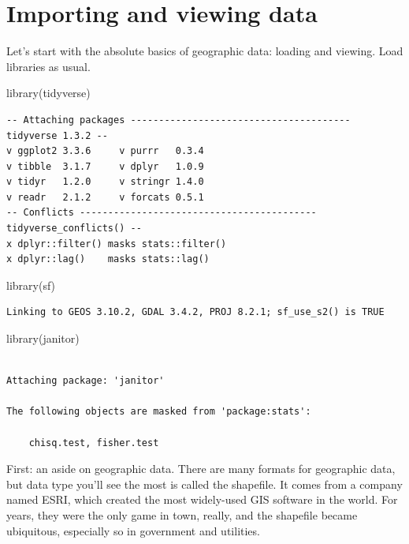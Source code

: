 \documentclass[
  letterpaper,
  DIV=11,
  numbers=noendperiod]{scrreprt}
\newenvironment{Shaded}{\begin{snugshade}}{\end{snugshade}}
\newcommand{\FunctionTok}[1]{\textcolor[rgb]{0.28,0.35,0.67}{#1}}
\newcommand{\NormalTok}[1]{\textcolor[rgb]{0.00,0.23,0.31}{#1}}
\begin{document}
\hypertarget{importing-and-viewing-data}{%
\section{Importing and viewing data}\label{importing-and-viewing-data}}

Let's start with the absolute basics of geographic data: loading and
viewing. Load libraries as usual.

\begin{Shaded}
\begin{Highlighting}[]
\FunctionTok{library}\NormalTok{(tidyverse)}
\end{Highlighting}
\end{Shaded}

\begin{verbatim}
-- Attaching packages --------------------------------------- tidyverse 1.3.2 --
v ggplot2 3.3.6     v purrr   0.3.4
v tibble  3.1.7     v dplyr   1.0.9
v tidyr   1.2.0     v stringr 1.4.0
v readr   2.1.2     v forcats 0.5.1
-- Conflicts ------------------------------------------ tidyverse_conflicts() --
x dplyr::filter() masks stats::filter()
x dplyr::lag()    masks stats::lag()
\end{verbatim}

\begin{Shaded}
\begin{Highlighting}[]
\FunctionTok{library}\NormalTok{(sf)}
\end{Highlighting}
\end{Shaded}

\begin{verbatim}
Linking to GEOS 3.10.2, GDAL 3.4.2, PROJ 8.2.1; sf_use_s2() is TRUE
\end{verbatim}

\begin{Shaded}
\begin{Highlighting}[]
\FunctionTok{library}\NormalTok{(janitor)}
\end{Highlighting}
\end{Shaded}

\begin{verbatim}

Attaching package: 'janitor'

The following objects are masked from 'package:stats':

    chisq.test, fisher.test
\end{verbatim}

First: an aside on geographic data. There are many formats for
geographic data, but data type you'll see the most is called the
shapefile. It comes from a company named ESRI, which created the most
widely-used GIS software in the world. For years, they were the only
game in town, really, and the shapefile became ubiquitous, especially so
in government and utilities.
\end{document}
